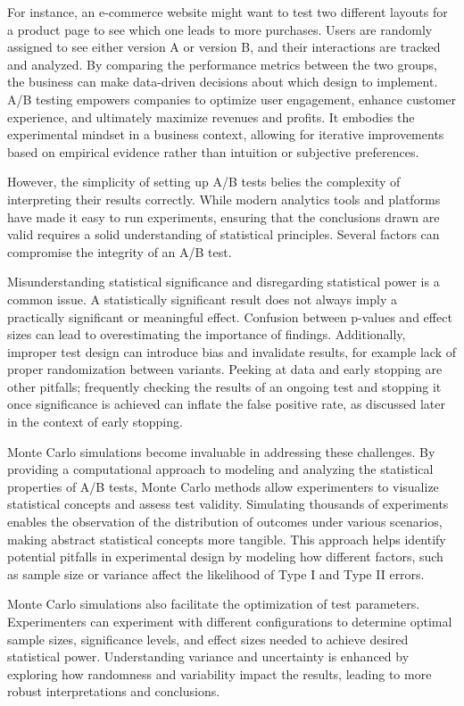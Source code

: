 \documentclass[final,5p,times,twocolumn,authoryear]{elsarticle}
\begin{document}
For instance, an e-commerce website might want to test two different layouts for a product page to see which one leads to more purchases. Users are randomly assigned to see either version A or version B, and their interactions are tracked and analyzed. By comparing the performance metrics between the two groups, the business can make data-driven decisions about which design to implement. A/B testing empowers companies to optimize user engagement, enhance customer experience, and ultimately maximize revenues and profits. It embodies the experimental mindset in a business context, allowing for iterative improvements based on empirical evidence rather than intuition or subjective preferences.

However, the simplicity of setting up A/B tests belies the complexity of interpreting their results correctly. While modern analytics tools and platforms have made it easy to run experiments, ensuring that the conclusions drawn are valid requires a solid understanding of statistical principles. Several factors can compromise the integrity of an A/B test.

Misunderstanding statistical significance and disregarding statistical power is a common issue. A statistically significant result does not always imply a practically significant or meaningful effect. Confusion between p-values and effect sizes can lead to overestimating the importance of findings. Additionally, improper test design can introduce bias and invalidate results, for example lack of proper randomization between variants. Peeking at data and early stopping are other pitfalls; frequently checking the results of an ongoing test and stopping it once significance is achieved can inflate the false positive rate, as discussed later in the context of early stopping.

Monte Carlo simulations become invaluable in addressing these challenges. By providing a computational approach to modeling and analyzing the statistical properties of A/B tests, Monte Carlo methods allow experimenters to visualize statistical concepts and assess test validity. Simulating thousands of experiments enables the observation of the distribution of outcomes under various scenarios, making abstract statistical concepts more tangible. This approach helps identify potential pitfalls in experimental design by modeling how different factors, such as sample size or variance affect the likelihood of Type I and Type II errors.

Monte Carlo simulations also facilitate the optimization of test parameters. Experimenters can experiment with different configurations to determine optimal sample sizes, significance levels, and effect sizes needed to achieve desired statistical power. Understanding variance and uncertainty is enhanced by exploring how randomness and variability impact the results, leading to more robust interpretations and conclusions.
\end{document}
